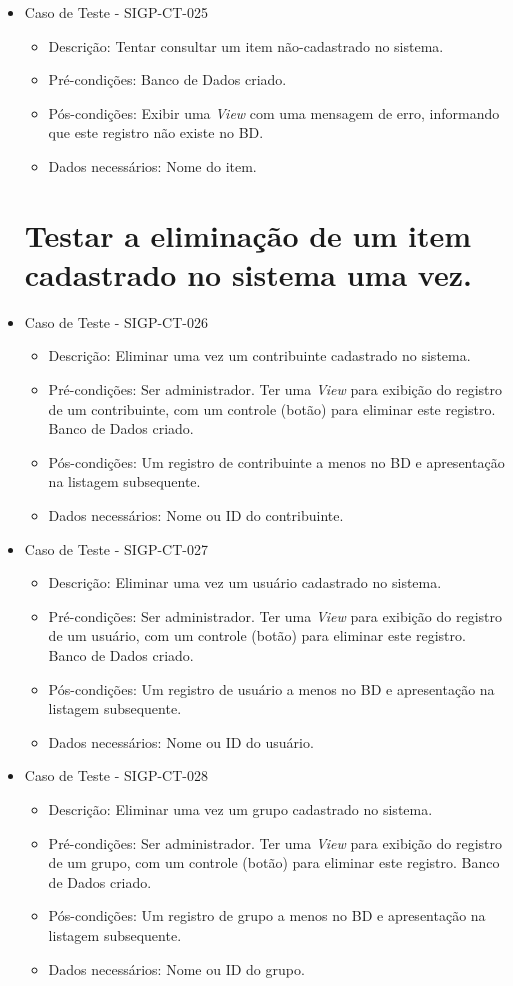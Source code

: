 \documentclass[11pt, a4paper]{book}
\begin{document}
\begin{itemize}
	\item Caso de Teste - SIGP-CT-025
	\begin{itemize}
	\item Descrição: Tentar consultar um item não-cadastrado no sistema.
	\item Pré-condições: Banco de Dados criado.
	\item Pós-condições: Exibir uma \emph{View} com uma mensagem de erro, informando que este registro não existe no BD.
	\item Dados necessários: Nome do item.
	\end{itemize}

\newpage
\section{Testar a eliminação de um item cadastrado no sistema uma vez.}
\label{sec:elimumavez}

	\item Caso de Teste - SIGP-CT-026
	\begin{itemize}
	\item Descrição: Eliminar uma vez um contribuinte cadastrado no sistema.
	\item Pré-condições: Ser administrador. Ter uma \emph{View} para exibição do registro de um contribuinte, com um controle (botão) para eliminar este registro. Banco de Dados criado.
	\item Pós-condições: Um registro de contribuinte a menos no BD e apresentação na listagem subsequente.
	\item Dados necessários: Nome ou ID do contribuinte.
	\end{itemize}

	\item Caso de Teste - SIGP-CT-027
	\begin{itemize}
	\item Descrição: Eliminar uma vez um usuário cadastrado no sistema.
	\item Pré-condições: Ser administrador. Ter uma \emph{View} para exibição do registro de um usuário, com um controle (botão) para eliminar este registro. Banco de Dados criado.
	\item Pós-condições: Um registro de usuário a menos no BD e apresentação na listagem subsequente.
	\item Dados necessários: Nome ou ID do usuário.
	\end{itemize}

          \item Caso de Teste - SIGP-CT-028
	\begin{itemize}
	\item Descrição: Eliminar uma vez um grupo cadastrado no sistema.
	\item Pré-condições: Ser administrador. Ter uma \emph{View} para exibição do registro de um grupo, com um controle (botão) para eliminar este registro. Banco de Dados criado.
	\item Pós-condições: Um registro de grupo a menos no BD e apresentação na listagem subsequente.
	\item Dados necessários: Nome ou ID do grupo.
	\end{itemize}


\end{itemize}
\end{document}
